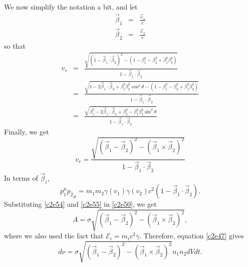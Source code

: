 \begin{enumerate}
We now simplify the notation a bit, and let
\begin{eqnarray}
\vec{\beta}_1 &=& \frac{\vec{v}_1}{c} \label{c2e52} \\
\vec{\beta}_2 &=& \frac{\vec{v}_2}{c} \label{c2e53}
\end{eqnarray}
so that
\begin{eqnarray*}
v_r &=& \frac{\sqrt{(1 - \vec{\beta}_1\cdot\vec{\beta}_2)^2 - 
	(1 - \beta_1^2 - \beta_2^2 + \beta_1^2\beta_2^2)}}
	{1 - \vec{\beta}_1\cdot\vec{\beta}_2} \\
 &=& \frac{\sqrt{1 - 2\vec{\beta}_1\cdot\vec{\beta}_2 + 
 			\beta_1^2\beta_2^2\cos^2\theta - 
			 (1 - \beta_1^2 - \beta_2^2 + \beta_1^2\beta_2^2)}}
			 {1 - \vec{\beta}_1\cdot\vec{\beta}_2} \\
 &=& \frac{\sqrt{\beta_1^2 - 2\vec{\beta}_1\cdot\vec{\beta}_2 + 
 				 \beta_2^2 - \beta_1^2\beta_2^2\sin^2\theta }}
		 {1 - \vec{\beta}_1\cdot\vec{\beta}_2}
\end{eqnarray*}
Finally, we get
\begin{equation}\label{c2e54}
v_r = 
\frac{\sqrt{(\vec{\beta}_1 - \vec{\beta}_2)^2 - 
	  (\vec{\beta}_1 \times \vec{\beta}_2)^2}}
  {1 - \vec{\beta}_1\cdot\vec{\beta}_2}
\end{equation}
In terms of $\vec{\beta}_i$,
\begin{equation}\label{c2e55}
p_1^\mu {p_2}_\mu = 
m_1m_2\gamma(v_1)\gamma(v_2)c^2\left(1 - \vec{\beta}_1\cdot\vec{\beta}_2\right).
\end{equation}
Substituting \eqref{c2e54} and \eqref{c2e55} in \eqref{c2e50}, we get
\begin{equation}\label{c2e56}
A = \sigma 
\sqrt{(\vec{\beta}_1-\vec{\beta}_2)^2-(\vec{\beta}_1 \times \vec{\beta}_2)^2},
\end{equation}
where we also used the fact that $\mathcal{E}_i = m_ic^2\gamma$. Therefore, 
equation \eqref{c2e47} gives
\begin{equation}\label{c2e57}
d\nu = \sigma 
\sqrt{(\vec{\beta}_1-\vec{\beta}_2)^2-(\vec{\beta}_1 \times \vec{\beta}_2)^2}
	n_1n_2dVdt.
\end{equation}


\end{enumerate}
